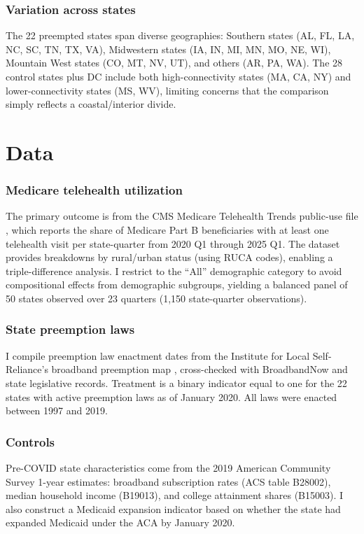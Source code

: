 \documentclass[12pt]{article}
\begin{document}
\subsubsection*{Variation across states} The 22 preempted states span diverse geographies: Southern states (AL, FL, LA, NC, SC, TN, TX, VA), Midwestern states (IA, IN, MI, MN, MO, NE, WI), Mountain West states (CO, MT, NV, UT), and others (AR, PA, WA). The 28 control states plus DC include both high-connectivity states (MA, CA, NY) and lower-connectivity states (MS, WV), limiting concerns that the comparison simply reflects a coastal/interior divide.


\section{Data}

\subsubsection*{Medicare telehealth utilization} The primary outcome is from the CMS Medicare Telehealth Trends public-use file \citep{cms2024telehealth}, which reports the share of Medicare Part B beneficiaries with at least one telehealth visit per state-quarter from 2020 Q1 through 2025 Q1. The dataset provides breakdowns by rural/urban status (using RUCA codes), enabling a triple-difference analysis. I restrict to the ``All'' demographic category to avoid compositional effects from demographic subgroups, yielding a balanced panel of 50 states observed over 23 quarters (1,150 state-quarter observations).

\subsubsection*{State preemption laws} I compile preemption law enactment dates from the Institute for Local Self-Reliance's broadband preemption map \citep{ilsr2020preemption}, cross-checked with BroadbandNow and state legislative records. Treatment is a binary indicator equal to one for the 22 states with active preemption laws as of January 2020. All laws were enacted between 1997 and 2019.

\subsubsection*{Controls} Pre-COVID state characteristics come from the 2019 American Community Survey 1-year estimates: broadband subscription rates (ACS table B28002), median household income (B19013), and college attainment shares (B15003). I also construct a Medicaid expansion indicator based on whether the state had expanded Medicaid under the ACA by January 2020.
\end{document}
